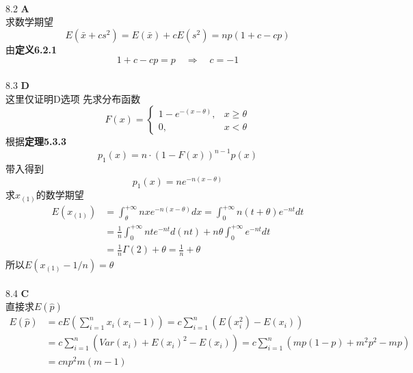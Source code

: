 \documentclass[a4paper]{ctexart}    %
\begin{document}
	\\
	8.2 \quad \textbf{A} \\
	求数学期望
	\begin{equation*}
		E(\bar{x} + cs^2) = E(\bar{x}) + cE(s^2) = np(1+c-cp)
	\end{equation*}
	由\textbf{定义6.2.1}
	\begin{equation*}
		1+c-cp = p \quad \Rightarrow \quad c = -1
	\end{equation*}
	\\
	8.3 \quad \textbf{D} \\
	这里仅证明D选项
	先求分布函数
	\begin{equation*}
		F(x) = 
		\begin{cases}
			1 - e^{-(x-\theta)}, & x \geq \theta \\
			0, & x < \theta
		\end{cases}
	\end{equation*}
	根据\textbf{定理5.3.3}
	\begin{equation*}
		p_1(x) = n \cdot (1-F(x))^{n-1} p(x)
	\end{equation*}
	带入得到
	\begin{equation*}
		p_1(x) = n e^{-n(x-\theta)}
	\end{equation*}
	求$ x_{(1)} $的数学期望
	\begin{equation*}
		\begin{split}
			E(x_{(1)}) &= \int_{\theta}^{+\infty} nx e^{-n(x -\theta)}dx = \int_{0}^{+\infty} n(t+\theta)e^{-nt}dt \\
			&= \frac{1}{n} \int_{0}^{+\infty} nt e^{-nt}d(nt) + n\theta \int_{0}^{+\infty} e^{-nt}dt \\
			&= \frac{1}{n} \Gamma(2) + \theta = \frac{1}{n} + \theta
		\end{split}
	\end{equation*}
	所以$ E(x_{(1)} - 1/n) = \theta $ \\
	\\
	8.4 \quad \textbf{C} \\
	直接求$ E(\hat{p}) $
	\begin{equation*}
		\begin{split}
			E(\hat{p}) &= c E\left(\sum\limits_{i=1}^{n} x_i(x_i - 1)\right) = c \sum\limits_{i=1}^n\left(E(x_i^2) - E(x_i)\right) \\
			&= c \sum\limits_{i=1}^n \left(Var(x_i) + E(x_i)^2 - E(x_i)\right) = c\sum\limits_{i=1}^n(mp(1-p) + m^2p^2 - mp) \\
			&= cnp^2m(m-1)
		\end{split}
	\end{equation*}
\end{document}
